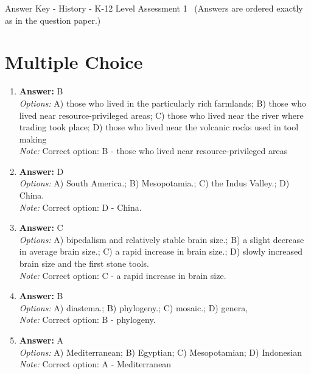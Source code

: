 \documentclass[12pt]{article}
\begin{document}
\begin{center}
Answer Key - History - K-12 Level Assessment 1 \
\small (Answers are ordered exactly as in the question paper.)
\end{center}

\section*{Multiple Choice}
\begin{enumerate}[label=\arabic*.]
\item \textbf{Answer:} B
\\ \textit{Options:} A) those who lived in the particularly rich farmlands; B) those who lived near resource-privileged areas; C) those who lived near the river where trading took place; D) those who lived near the volcanic rocks used in tool making
\\ \textit{Note:} Correct option: B - those who lived near resource-privileged areas
\item \textbf{Answer:} D
\\ \textit{Options:} A) South America.; B) Mesopotamia.; C) the Indus Valley.; D) China.
\\ \textit{Note:} Correct option: D - China.
\item \textbf{Answer:} C
\\ \textit{Options:} A) bipedalism and relatively stable brain size.; B) a slight decrease in average brain size.; C) a rapid increase in brain size.; D) slowly increased brain size and the first stone tools.
\\ \textit{Note:} Correct option: C - a rapid increase in brain size.
\item \textbf{Answer:} B
\\ \textit{Options:} A) diastema.; B) phylogeny.; C) mosaic.; D) genera,
\\ \textit{Note:} Correct option: B - phylogeny.
\item \textbf{Answer:} A
\\ \textit{Options:} A) Mediterranean; B) Egyptian; C) Mesopotamian; D) Indonesian
\\ \textit{Note:} Correct option: A - Mediterranean
\end{enumerate}
\end{document}
